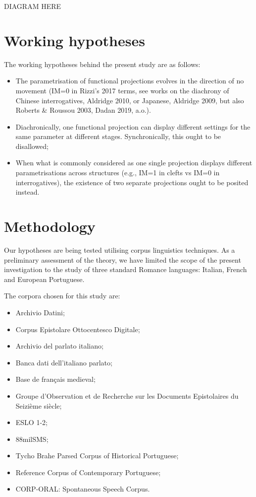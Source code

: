 \documentclass[fleqn,10pt]{wlscirep}
\begin{document}
DIAGRAM HERE

\section*{Working hypotheses}
The working hypotheses behind the present study are as follows:

\begin{itemize}
\item The parametrisation of functional projections evolves in the direction of no movement (IM=0 in Rizzi’s 2017 terms, see works on the diachrony of Chinese interrogatives, Aldridge 2010, or Japanese, Aldridge 2009, but also Roberts & Roussou 2003, Dadan 2019, a.o.).

\item Diachronically, one functional projection can display different settings for the same parameter at different stages. Synchronically, this ought to be disallowed;
\item When what is commonly considered as one single projection displays different parametrisations across structures (e.g., IM=1 in clefts vs IM=0 in interrogatives), the existence of two separate projections ought to be posited instead.
\end{itemize}

\section*{Methodology}

Our hypotheses are being tested utilising corpus linguistics techniques. 
As a preliminary assessment of the theory, we have limited the scope of the present investigation to the study of three standard Romance languages: Italian, French and European Portuguese. 

The corpora chosen for this study are: 

\begin{itemize}
\item Archivio Datini;
\item Corpus Epistolare Ottocentesco Digitale;
\item Archivio del parlato italiano;
\item Banca dati dell’italiano parlato;
\item Base de français medieval;
\item Groupe d’Observation et de Recherche sur les Documents Epistolaires du Seizième siècle;
\item ESLO 1-2;
\item 88milSMS; 
\item Tycho Brahe Parsed Corpus of Historical Portuguese;
\item Reference Corpus of Contemporary Portuguese;
\item CORP-ORAL: Spontaneous Speech Corpus.
\end{itemize}
\end{document}
